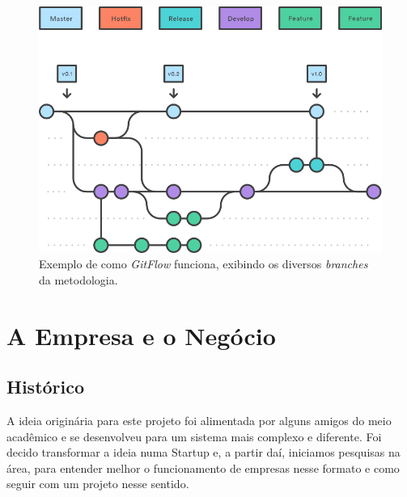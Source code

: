 \documentclass[12pt,a4paper,twoside,hyphens,english,brazil]{abntex2}
\begin{document}
\begin{figure}[!hb]
	\centering
	\includegraphics[width=0.7\linewidth]{imagens/gitflow.png}
	\caption{Exemplo de como \emph{GitFlow} funciona, exibindo os diversos \emph{branches} da metodologia.}
\end{figure}


\chapter{A Empresa e o Negócio}


\section{Histórico}
A ideia originária para este projeto foi alimentada por alguns amigos do meio acadêmico e se desenvolveu para um sistema mais complexo e diferente. Foi decido transformar a ideia numa Startup\footnotemark{} e, a partir daí, iniciamos pesquisas na área, para entender melhor o funcionamento de empresas nesse formato e como seguir com um projeto nesse sentido.
\end{document}
